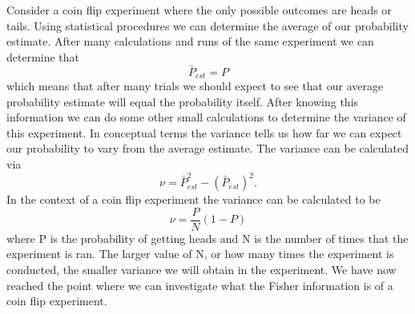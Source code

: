 \documentclass[twocolumn]{article}
\begin{document}
Consider a coin flip experiment where the only possible outcomes are heads or tails. Using statistical procedures we can determine the average of our probability estimate. After many calculations and runs of the same experiment we can determine that
\begin{equation}
\bar{P}_{est}=P
\end{equation}
which means that after many trials we should expect to see that our average probability estimate will equal the probability itself. After knowing this information we can do some other small calculations to determine the variance of this experiment. In conceptual terms the variance tells us how far we can expect our probability to vary from the average estimate. The variance can be calculated via
\begin{equation}
\nu=\bar{P}^2_{est}-(\bar{P}_{est})^2.
\end{equation}
In the context of a coin flip experiment the variance can be calculated to be
\begin{equation}
\nu=\frac{P}{N}(1-P)
\end{equation}
where P is the probability of getting heads and N is the number of times that the experiment is ran. The larger value of N, or how many times the experiment is conducted, the smaller variance we will obtain in the experiment. We have now reached the point where we can investigate what the Fisher information is of a coin flip experiment.
\end{document}
